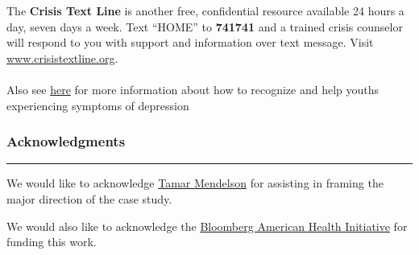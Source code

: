 \documentclass[
]{article}
\begin{document}
The \textbf{Crisis Text Line} is another free, confidential resource
available 24 hours a day, seven days a week. Text ``HOME'' to
\textbf{741741} and a trained crisis counselor will respond to you with
support and information over text message. Visit
\url{www.crisistextline.org}.

\hypertarget{section-55}{%
\paragraph{}\label{section-55}}

Also see \href{https://www.mhanational.org/depression-teens-0}{here} for
more information about how to recognize and help youths experiencing
symptoms of depression

\hypertarget{acknowledgments}{%
\subsubsection{\texorpdfstring{\textbf{Acknowledgments}}{Acknowledgments}}\label{acknowledgments}}

\begin{center}\rule{0.5\linewidth}{0.5pt}\end{center}

We would like to acknowledge
\href{https://www.jhsph.edu/faculty/directory/profile/1770/tamar-mendelson}{Tamar
Mendelson} for assisting in framing the major direction of the case
study.

We would also like to acknowledge the
\href{https://americanhealth.jhu.edu/}{Bloomberg American Health
Initiative} for funding this work.
\end{document}
